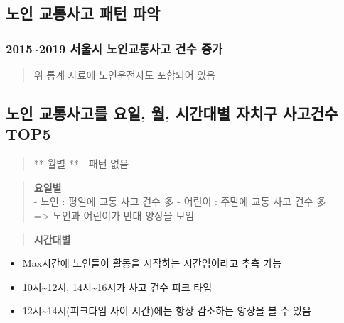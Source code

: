\documentclass[11pt]{article}
\providecommand{\tightlist}{%
      \setlength{\itemsep}{0pt}\setlength{\parskip}{0pt}}
\begin{document}
    \subsection{노인 교통사고 패턴
파악}\label{uxb178uxc778-uxad50uxd1b5uxc0acuxace0-uxd328uxd134-uxd30cuxc545}

    \subsubsection{2015\textasciitilde{}2019 서울시 노인교통사고 건수
증가}\label{uxc11cuxc6b8uxc2dc-uxb178uxc778uxad50uxd1b5uxc0acuxace0-uxac74uxc218-uxc99duxac00}

    

    \begin{quote}
위 통계 자료에 노인운전자도 포함되어 있음
\end{quote}

    \subsection{노인 교통사고를 요일, 월, 시간대별 자치구 사고건수
TOP5}\label{uxb178uxc778-uxad50uxd1b5uxc0acuxace0uxb97c-uxc694uxc77c-uxc6d4-uxc2dcuxac04uxb300uxbcc4-uxc790uxce58uxad6c-uxc0acuxace0uxac74uxc218-top5}

    \begin{quote}
** 월별 ** - 패턴 없음
\end{quote}

     

    \begin{quote}
\textbf{요일별}\\
- 노인 : 평일에 교통 사고 건수 多 - 어린이 : 주말에 교통 사고 건수 多\\
=\textgreater{} 노인과 어린이가 반대 양상을 보임
\end{quote}

     

    \begin{quote}
\textbf{시간대별}
\end{quote}

\begin{itemize}
\tightlist
\item
  Max시간에 노인들이 활동을 시작하는 시간임이라고 추측 가능
\item
  10시\textasciitilde{}12시, 14시\textasciitilde{}16시가 사고 건수 피크
  타임
\item
  12시\textasciitilde{}14시(피크타임 사이 시간)에는 항상 감소하는 양상을
  볼 수 있음
\end{itemize}
\end{document}
